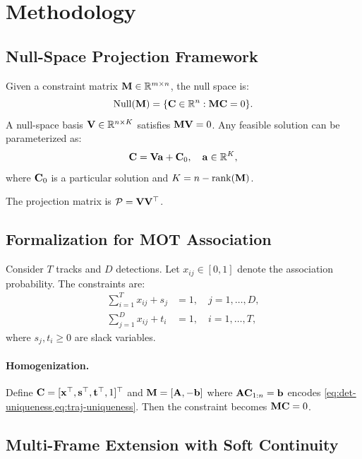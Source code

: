 \section{Methodology}
\label{sec:method}

\subsection{Null-Space Projection Framework}

Given a constraint matrix $\mathbf{M} \in \mathbb{R}^{m \times n}$, the null 
space is:
\begin{equation}
    \mathrm{Null}(\mathbf{M}) = \{\mathbf{C} \in \mathbb{R}^n : \mathbf{M} \mathbf{C} = 0\}.
\end{equation}
A null-space basis $\mathbf{V} \in \mathbb{R}^{n \times K}$ satisfies $\mathbf{M} \mathbf{V} = 0$. 
Any feasible solution can be parameterized as:
\begin{equation}
    \mathbf{C} = \mathbf{V} \mathbf{a} + \mathbf{C}_0, \quad \mathbf{a} \in \mathbb{R}^K,
\end{equation}
where $\mathbf{C}_0$ is a particular solution and $K = n - \mathrm{rank}(\mathbf{M})$.

The projection matrix is $\mathcal{P} = \mathbf{V} \mathbf{V}^\top$.

\subsection{Formalization for MOT Association}

Consider $T$ tracks and $D$ detections. Let $x_{ij} \in [0,1]$ denote 
the association probability. The constraints are:
\begin{align}
    \sum_{i=1}^{T} x_{ij} + s_j &= 1, \quad j = 1, \dots, D, 
        \label{eq:det-uniqueness}\\
    \sum_{j=1}^{D} x_{ij} + t_i &= 1, \quad i = 1, \dots, T,
        \label{eq:traj-uniqueness}
\end{align}
where $s_j, t_i \ge 0$ are slack variables.

\paragraph{Homogenization.} Define 
$\mathbf{C} = [\mathbf{x}^\top, \mathbf{s}^\top, \mathbf{t}^\top, 1]^\top$ 
and $\mathbf{M} = [\mathbf{A}, -\mathbf{b}]$ where 
$\mathbf{A} \mathbf{C}_{1:n} = \mathbf{b}$ encodes 
\cref{eq:det-uniqueness,eq:traj-uniqueness}. Then the constraint 
becomes $\mathbf{M} \mathbf{C} = 0$.

\subsection{Multi-Frame Extension with Soft Continuity}

